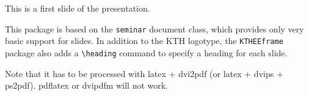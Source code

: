 \documentclass[a4]{seminar}
\begin{document}
\begin{slide}
  This is a first slide of the presentation.
  
\end{slide}

\begin{slide}
  
  This package is based on the \texttt{seminar} document class, which
  provides only very basic support for slides. In addition to the KTH
  logotype, the \texttt{KTHEEframe} package also adds a \verb+\heading+
  command to specify a heading for each slide.

  Note that it has to be processed with latex + dvi2pdf (or latex +
  dvips + ps2pdf). pdflatex or dvipdfm will not work.

\end{slide}
\end{document}
